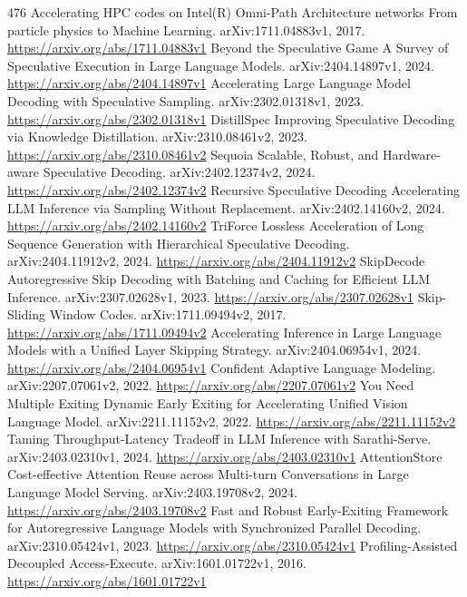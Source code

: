 \documentclass[11pt]{article}
\begin{document}
\begin{thebibliography}{476}
 Accelerating HPC codes on Intel(R) Omni-Path Architecture networks From particle physics to Machine Learning. arXiv:1711.04883v1, 2017. \url{https://arxiv.org/abs/1711.04883v1}
 Beyond the Speculative Game A Survey of Speculative Execution in Large Language Models. arXiv:2404.14897v1, 2024. \url{https://arxiv.org/abs/2404.14897v1}
 Accelerating Large Language Model Decoding with Speculative Sampling. arXiv:2302.01318v1, 2023. \url{https://arxiv.org/abs/2302.01318v1}
 DistillSpec Improving Speculative Decoding via Knowledge Distillation. arXiv:2310.08461v2, 2023. \url{https://arxiv.org/abs/2310.08461v2}
 Sequoia Scalable, Robust, and Hardware-aware Speculative Decoding. arXiv:2402.12374v2, 2024. \url{https://arxiv.org/abs/2402.12374v2}
 Recursive Speculative Decoding Accelerating LLM Inference via Sampling Without Replacement. arXiv:2402.14160v2, 2024. \url{https://arxiv.org/abs/2402.14160v2}
 TriForce Lossless Acceleration of Long Sequence Generation with Hierarchical Speculative Decoding. arXiv:2404.11912v2, 2024. \url{https://arxiv.org/abs/2404.11912v2}
 SkipDecode Autoregressive Skip Decoding with Batching and Caching for Efficient LLM Inference. arXiv:2307.02628v1, 2023. \url{https://arxiv.org/abs/2307.02628v1}
 Skip-Sliding Window Codes. arXiv:1711.09494v2, 2017. \url{https://arxiv.org/abs/1711.09494v2}
 Accelerating Inference in Large Language Models with a Unified Layer Skipping Strategy. arXiv:2404.06954v1, 2024. \url{https://arxiv.org/abs/2404.06954v1}
 Confident Adaptive Language Modeling. arXiv:2207.07061v2, 2022. \url{https://arxiv.org/abs/2207.07061v2}
 You Need Multiple Exiting Dynamic Early Exiting for Accelerating Unified Vision Language Model. arXiv:2211.11152v2, 2022. \url{https://arxiv.org/abs/2211.11152v2}
 Taming Throughput-Latency Tradeoff in LLM Inference with Sarathi-Serve. arXiv:2403.02310v1, 2024. \url{https://arxiv.org/abs/2403.02310v1}
 AttentionStore Cost-effective Attention Reuse across Multi-turn Conversations in Large Language Model Serving. arXiv:2403.19708v2, 2024. \url{https://arxiv.org/abs/2403.19708v2}
 Fast and Robust Early-Exiting Framework for Autoregressive Language Models with Synchronized Parallel Decoding. arXiv:2310.05424v1, 2023. \url{https://arxiv.org/abs/2310.05424v1}
 Profiling-Assisted Decoupled Access-Execute. arXiv:1601.01722v1, 2016. \url{https://arxiv.org/abs/1601.01722v1}

\end{thebibliography}
\end{document}

